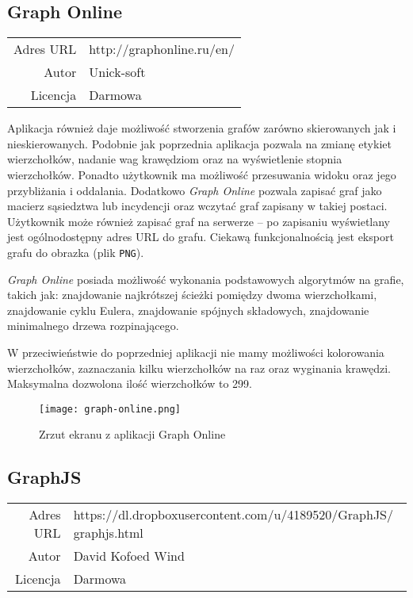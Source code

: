 \subsection*{Graph Online}
\bigskip
\noindent\begin{tabularx}{\textwidth}{r|X|}
\cline{2-2}
  Adres URL & http://graphonline.ru/en/ \\ 
\cline{2-2}
 Autor & Unick-soft \\ 
\cline{2-2}
 Licencja & Darmowa\\  
\cline{2-2}
\end{tabularx} 
\bigskip

Aplikacja również daje możliwość stworzenia grafów zarówno skierowanych jak i nieskierowanych. Podobnie jak poprzednia aplikacja pozwala na zmianę etykiet wierzchołków, nadanie wag krawędziom oraz na wyświetlenie stopnia wierzchołków. Ponadto użytkownik ma możliwość przesuwania widoku oraz jego przybliżania i oddalania. Dodatkowo \textit{Graph Online} pozwala zapisać graf jako macierz sąsiedztwa lub incydencji oraz wczytać graf zapisany w takiej postaci. Użytkownik może również zapisać graf na serwerze -- po zapisaniu wyświetlany jest ogólnodostępny adres URL do grafu. Ciekawą funkcjonalnością jest eksport grafu do obrazka (plik \texttt{PNG}).

\textit{Graph Online} posiada możliwość wykonania podstawowych algorytmów na grafie, takich jak: znajdowanie najkrótszej ścieżki pomiędzy dwoma wierzchołkami, znajdowanie cyklu Eulera, znajdowanie spójnych składowych, znajdowanie minimalnego drzewa rozpinającego.  

W przeciwieństwie do poprzedniej aplikacji nie mamy możliwości kolorowania wierzchołków, zaznaczania kilku wierzchołków na raz oraz wyginania krawędzi. Maksymalna dozwolona ilość wierzchołków to 299. 

\begin{figure}[H]
\centering
\texttt{[image: graph-online.png]}
\caption{Zrzut ekranu z aplikacji Graph Online}
\end{figure}

\subsection*{GraphJS}
\bigskip
\noindent\begin{tabularx}{\textwidth}{r|X|}
\cline{2-2}
  Adres URL & https://dl.dropboxusercontent.com/u/4189520/GraphJS/ graphjs.html \\ 
\cline{2-2} 
 Autor & David Kofoed Wind \\ 
\cline{2-2}
 Licencja & Darmowa\\  
\cline{2-2}
\end{tabularx}
\bigskip

